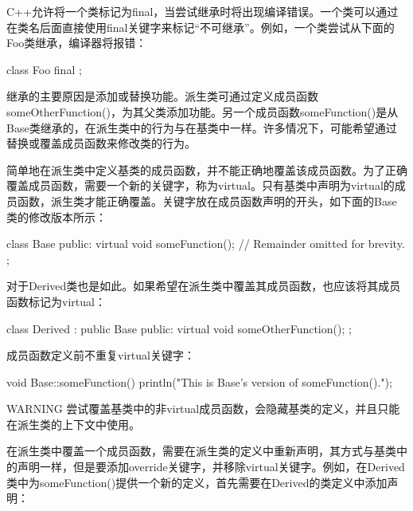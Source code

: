 
C++允许将一个类标记为final，当尝试继承时将出现编译错误。一个类可以通过在类名后面直接使用final关键字来标记“不可继承”。例如，一个类尝试从下面的Foo类继承，编译器将报错：

\begin{cpp}
class Foo final { };
\end{cpp}


继承的主要原因是添加或替换功能。派生类可通过定义成员函数someOtherFunction()，为其父类添加功能。另一个成员函数someFunction()是从Base类继承的，在派生类中的行为与在基类中一样。许多情况下，可能希望通过替换或覆盖成员函数来修改类的行为。


简单地在派生类中定义基类的成员函数，并不能正确地覆盖该成员函数。为了正确覆盖成员函数，需要一个新的关键字，称为virtual。只有基类中声明为virtual的成员函数，派生类才能正确覆盖。关键字放在成员函数声明的开头，如下面的Base类的修改版本所示：

\begin{cpp}
class Base
{
    public:
        virtual void someFunction();
        // Remainder omitted for brevity.
};
\end{cpp}

对于Derived类也是如此。如果希望在派生类中覆盖其成员函数，也应该将其成员函数标记为virtual：

\begin{cpp}
class Derived : public Base
{
    public:
        virtual void someOtherFunction();
};
\end{cpp}

成员函数定义前不重复virtual关键字：

\begin{cpp}
void Base::someFunction()
{
    println("This is Base's version of someFunction().");
}
\end{cpp}

\begin{myWarning}{WARNING}
尝试覆盖基类中的非virtual成员函数，会隐藏基类的定义，并且只能在派生类的上下文中使用。
\end{myWarning}


在派生类中覆盖一个成员函数，需要在派生类的定义中重新声明，其方式与基类中的声明一样，但是要添加override关键字，并移除virtual关键字。例如，在Derived类中为someFunction()提供一个新的定义，首先需要在Derived的类定义中添加声明：

